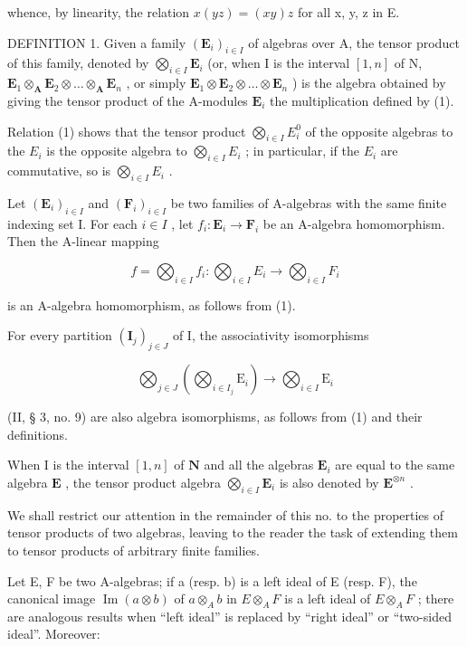 whence, by linearity, the relation \(x(yz) = (xy)z\) for all x, y, z in E.

DEFINITION 1. Given a family \((\mathbf{E}_i)_{i\in I}\) of algebras over A, the tensor product of this family, denoted by \(\bigotimes_{i\in I}\mathbf{E}_i\) (or, when I is the interval \([1,n]\) of N, \(\mathbf{E}_1\otimes_\mathbf{A}\mathbf{E}_2\otimes \dots \otimes_\mathbf{A}\mathbf{E}_n\) , or simply \(\mathbf{E}_1\otimes \mathbf{E}_2\otimes \dots \otimes \mathbf{E}_n\) ) is the algebra obtained by giving the tensor product of the A-modules \(\mathbf{E}_i\) the multiplication defined by (1).

Relation (1) shows that the tensor product \(\bigotimes_{i\in I}E_i^0\) of the opposite algebras to the \(E_{i}\) is the opposite algebra to \(\bigotimes_{i\in I}E_{i}\) ; in particular, if the \(E_{i}\) are commutative, so is \(\bigotimes_{i\in I}E_{i}\) .

Let \((\mathbf{E}_i)_{i\in I}\) and \((\mathbf{F}_i)_{i\in I}\) be two families of A-algebras with the same finite indexing set I. For each \(i\in I\) , let \(f_{i}\colon \mathbf{E}_{i}\to \mathbf{F}_{i}\) be an A-algebra homomorphism. Then the A-linear mapping

\[
f = \bigotimes_ {i \in I} f _ {i}: \bigotimes_ {i \in I} E _ {i} \rightarrow \bigotimes_ {i \in I} F _ {i}
\]

is an A-algebra homomorphism, as follows from (1).

For every partition \((\mathbf{I}_{j})_{j\in J}\) of I, the associativity isomorphisms

\[
\bigotimes_ {j \in J} \left(\bigotimes_ {i \in I _ {j}} \mathrm{E} _ {i}\right)\rightarrow \bigotimes_ {i \in I} \mathrm{E} _ {i}
\]

(II, § 3, no. 9) are also algebra isomorphisms, as follows from (1) and their definitions.

When I is the interval \([1, n]\) of \(\mathbf{N}\) and all the algebras \(\mathbf{E}_i\) are equal to the same algebra \(\mathbf{E}\) , the tensor product algebra \(\bigotimes_{i \in I} \mathbf{E}_i\) is also denoted by \(\mathbf{E}^{\otimes n}\) .

We shall restrict our attention in the remainder of this no. to the properties of tensor products of two algebras, leaving to the reader the task of extending them to tensor products of arbitrary finite families.

Let E, F be two A-algebras; if a (resp. b) is a left ideal of E (resp. F), the canonical image \(\operatorname{Im}(a \otimes b)\) of \(a \otimes_{A} b\) in \(E \otimes_{A} F\) is a left ideal of \(E \otimes_{A} F\) ; there are analogous results when ``left ideal'' is replaced by ``right ideal'' or ``two-sided ideal''. Moreover:

